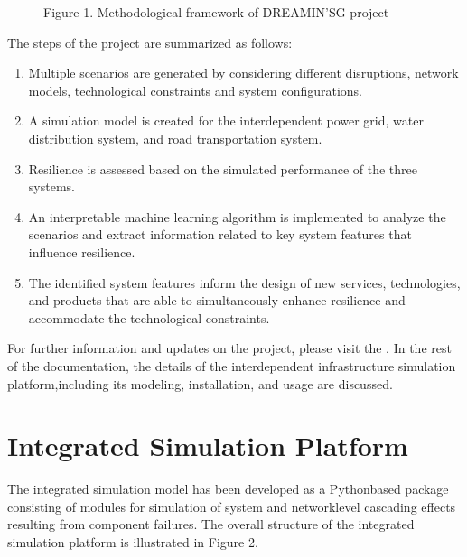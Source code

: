 \documentclass[letterpaper,10pt,english]{sphinxmanual}
\begin{document}
\begin{figure}[htbp]
\centering
\capstart

\noindent{}
\caption{Figure 1. Methodological framework of DREAMIN’SG project}\label{\detokenize{intro:id3}}\end{figure}

\sphinxAtStartPar
The steps of the project are summarized as follows:
\begin{enumerate}
%
\item {} 
\sphinxAtStartPar
Multiple scenarios are generated by considering different disruptions, network models, technological constraints and system configurations.

\item {} 
\sphinxAtStartPar
A simulation model is created for the interdependent power grid, water distribution system, and road transportation system.

\item {} 
\sphinxAtStartPar
Resilience is assessed based on the simulated performance of the three systems.

\item {} 
\sphinxAtStartPar
An interpretable machine learning algorithm is implemented to analyze the scenarios and extract information related to key system features that influence resilience.

\item {} 
\sphinxAtStartPar
The identified system features inform the design of new services, technologies, and prod\sphinxhyphen{}ucts that are able to simultaneously enhance resilience and accommodate the technological constraints.

\end{enumerate}

\sphinxAtStartPar
For further information and updates on the project, please visit the
.
In the rest of the documentation, the details of the interdependent infrastructure
simulation platform,including its modeling, installation, and usage are
discussed.


\chapter{Integrated Simulation Platform}
\label{\detokenize{model:integrated-simulation-platform}}\label{\detokenize{model::doc}}
\sphinxAtStartPar
The integrated simulation model has been developed as a Python\sphinxhyphen{}based package consisting of modules for simulation of system\sphinxhyphen{} and network\sphinxhyphen{}level
cascading effects resulting from component failures. The overall structure of the integrated simulation platform is illustrated in Figure 2.
\end{document}
